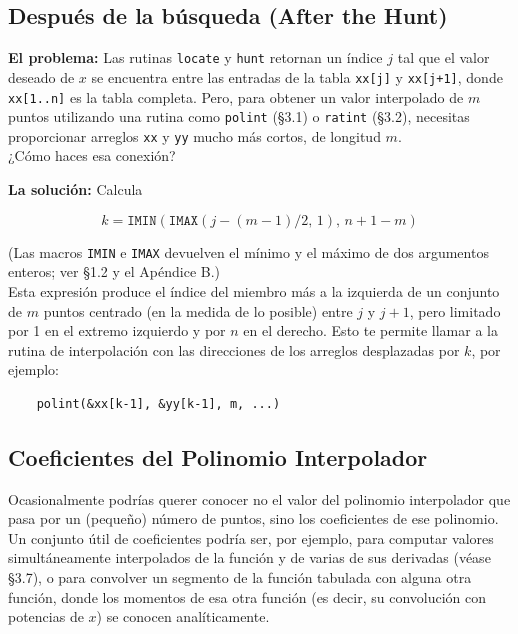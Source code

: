 \documentclass[10pt,a4paper]{book}
\begin{document}
\subsection*{Después de la búsqueda (After the Hunt)}

\textbf{El problema:} Las rutinas \texttt{locate} y \texttt{hunt} retornan un índice $j$ tal que el valor deseado de $x$ se encuentra entre las entradas de la tabla \texttt{xx[j]} y \texttt{xx[j+1]}, donde \texttt{xx[1..n]} es la tabla completa. Pero, para obtener un valor interpolado de $m$ puntos utilizando una rutina como \texttt{polint} (\S3.1) o \texttt{ratint} (\S3.2), necesitas proporcionar arreglos \texttt{xx} y \texttt{yy} mucho más cortos, de longitud $m$.\\

¿Cómo haces esa conexión?

\textbf{La solución:} Calcula

\[
k = \texttt{IMIN}(\texttt{IMAX}(j - (m-1)/2,\,1),\,n + 1 - m)
\]

(Las macros \texttt{IMIN} e \texttt{IMAX} devuelven el mínimo y el máximo de dos argumentos enteros; ver \S1.2 y el Apéndice B.)\\

Esta expresión produce el índice del miembro más a la izquierda de un conjunto de $m$ puntos centrado (en la medida de lo posible) entre $j$ y $j+1$, pero limitado por 1 en el extremo izquierdo y por $n$ en el derecho. Esto te permite llamar a la rutina de interpolación con las direcciones de los arreglos desplazadas por $k$, por ejemplo:

\begin{verbatim}
    polint(&xx[k-1], &yy[k-1], m, ...)
\end{verbatim}

\subsection{Coeficientes del Polinomio Interpolador}

Ocasionalmente podrías querer conocer no el valor del polinomio interpolador que pasa por un (pequeño) número de puntos, sino los coeficientes de ese polinomio. Un conjunto útil de coeficientes podría ser, por ejemplo, para computar valores simultáneamente interpolados de la función y de varias de sus derivadas (véase \S3.7), o para convolver un segmento de la función tabulada con alguna otra función, donde los momentos de esa otra función (es decir, su convolución con potencias de $x$) se conocen analíticamente.
\end{document}
